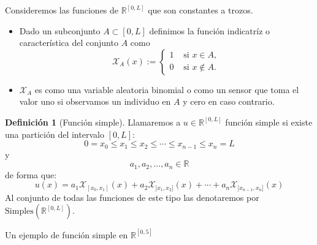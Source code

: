 \documentclass[10pt,handout]{beamer}
\theoremstyle{plain} %
\theoremstyle{plain} %
\theoremstyle{plain} %
\theoremstyle{plain} %
\theoremstyle{definition}
\newtheorem{defn}{Definici\'on}
\theoremstyle{example}
\theoremstyle{example}
\theoremstyle{remark}
\theoremstyle{remark}
\begin{document}
\begin{frame}
Consideremos las funciones de $\mathbb{R}^{[0,L]}$ que son constantes a trozos.
\begin{itemize}
\item Dado un subconjunto $A \subset [0,L]$ definimos la función indicatríz o característica del conjunto
$A$ como
$$
\mathcal{X}_A(x):= \left\{
\begin{array}{ccc}
1 & \text{ si } x \in A, \\ 
0 & \text{ si }  x \notin A.
\end{array}
\right.
$$
\item $\mathcal{X}_A$ es como una variable aleatoria binomial o como un sensor que toma el valor
uno si observamos un individuo en $A$ y cero en caso contrario.
\end{itemize}
\end{frame}

\begin{frame}
\begin{defn}[Función simple]
Llamaremos a $u \in \mathbb{R}^{[0,L]}$ función simple si existe una partición del intervalo $[0,L]:$
$$0=x_0  \le x_1 \le x_2 \le  \cdots \le x_{n-1} \le x_n = L$$ y $$a_1,a_2,\ldots,a_n \in \mathbb{R}$$
de forma que:
$$
u(x) = a_1 \mathcal{X}_{[x_0,x_1]}(x) + a_2 \mathcal{X}_{]x_1,x_2]}(x) + \cdots + a_n \mathcal{X}_{]x_{n-1},x_n]}(x)
$$
Al conjunto de todas las funciones de este tipo las denotaremos por
$\mathrm{Simples}(\mathbb{R}^{[0,L]}).$
\end{defn}
\end{frame}

\begin{frame}{Un ejemplo de función simple en $\mathbb{R}^{[0,5]}$}
\end{frame}
\end{document}
